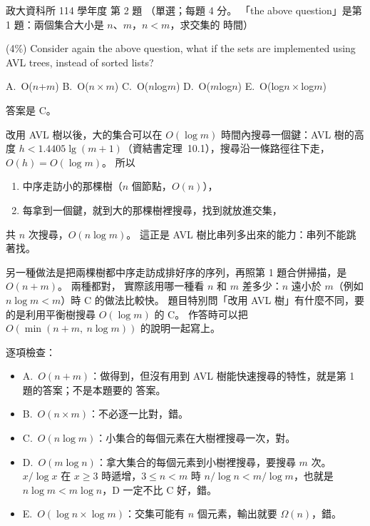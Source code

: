 \begin{pastexam}[label={px:nccu-114-dsa-02}]{政大資科所 114 學年度 第 2 題}
（單選；每題 4 分。 「the above question」是第 1 題：兩個集合大小是 $n$、$m$，$n<m$，求交集的
時間）

(4\%) Consider again the above question, what if the sets are implemented using AVL trees,
instead of sorted lists?

A.~O($n$+$m$) \qquad B.~O($n\times m$) \qquad C.~O($n$log$m$) \qquad D.~O($m$log$n$) \qquad
E.~O(log$n\times$log$m$)
\end{pastexam}

\begin{pastsoln}
答案是 C。

改用 AVL 樹以後，大的集合可以在 $O(\log m)$ 時間內搜尋一個鍵：AVL 樹的高度
$h < 1.4405 \lg(m + 1)$（資結書定理~10.1），搜尋沿一條路徑往下走，$O(h) = O(\log m)$。 所以
\begin{enumerate}
\item 中序走訪小的那棵樹（$n$ 個節點，$O(n)$），
\item 每拿到一個鍵，就到大的那棵樹裡搜尋，找到就放進交集，
\end{enumerate}
共 $n$ 次搜尋，$O(n \log m)$。 這正是 AVL 樹比串列多出來的能力：串列不能跳著找。

另一種做法是把兩棵樹都中序走訪成排好序的序列，再照第 1 題合併掃描，是 $O(n + m)$。 兩種都對，
實際該用哪一種看 $n$ 和 $m$ 差多少：$n$ 遠小於 $m$（例如 $n \log m < m$）時 C 的做法比較快。
題目特別問「改用 AVL 樹」有什麼不同，要的是利用平衡樹搜尋 $O(\log m)$ 的 C。 作答時可以把
$O(\min(n + m,\ n \log m))$ 的說明一起寫上。

逐項檢查：
\begin{itemize}
\item A.~$O(n + m)$：做得到，但沒有用到 AVL 樹能快速搜尋的特性，就是第 1 題的答案；不是本題要的
答案。
\item B.~$O(n \times m)$：不必逐一比對，錯。
\item C.~$O(n \log m)$：小集合的每個元素在大樹裡搜尋一次，對。
\item D.~$O(m \log n)$：拿大集合的每個元素到小樹裡搜尋，要搜尋 $m$ 次。 $x / \log x$ 在 $x \ge 3$
時遞增，$3 \le n < m$ 時 $n / \log n < m / \log m$，也就是 $n \log m < m \log n$，D 一定不比 C 好，錯。
\item E.~$O(\log n \times \log m)$：交集可能有 $n$ 個元素，輸出就要 $\Omega(n)$，錯。
\end{itemize}
\end{pastsoln}
